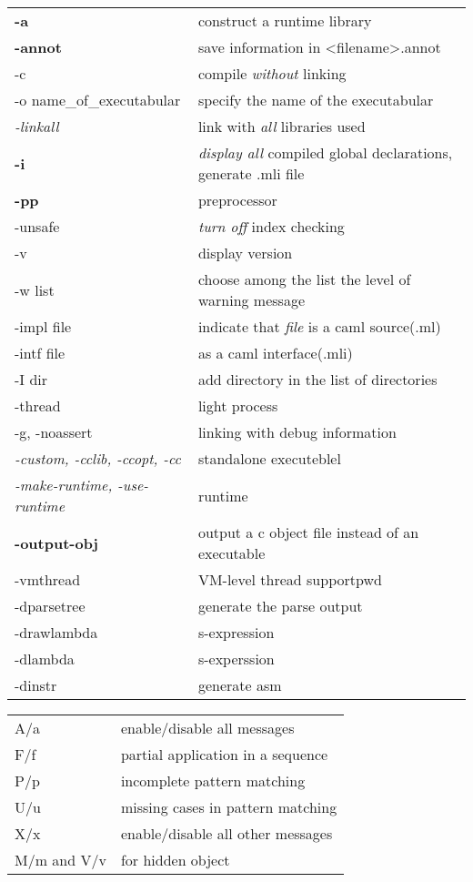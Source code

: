   



  \begin{tabular}{|l|l|}
    \hline
    \textbf{-a} & construct a runtime library \\
    \textbf{-annot} & save information in <filename>.annot \\
    -c & compile \textit{without} linking \\
    -o name\_of\_executabular & specify the name of the executabular \\
    \emph{-linkall} & link with \textit{all} libraries used \\
    \textbf{-i} & \textit{display all } compiled global declarations, generate
    .mli file \\
    \textbf{-pp} & preprocessor \\
    -unsafe & \textit{turn off} index checking \\
    -v & display version \\
    -w list & choose among the list the level of warning message \\
    -impl file & indicate that \textit{file} is a caml source(.ml) \\
    -intf file & as a caml interface(.mli) \\
    -I dir & add directory in the list of directories \\
    \hline
    -thread & light process \\
    -g, -noassert & linking  with debug information\\
    \textit{-custom, -cclib, -ccopt, -cc} & standalone executeblel \\
    \textit{-make-runtime, -use-runtime} & runtime \\
    \textbf{-output-obj} & output a c object file instead of an
    executable \\
    \hline
    -vmthread & VM-level thread supportpwd
\\
    \hline
    -dparsetree & generate the parse output\\
    -drawlambda & s-expression\\
    -dlambda & s-experssion \\
    -dinstr & generate asm \\
    \hline
\end{tabular}


\begin{tabular}{|l|l|}
    \hline
  A/a & enable/disable all messages \\
  F/f & partial application in a sequence \\
  P/p & incomplete pattern matching \\
  U/u & missing cases in pattern matching \\
  X/x & enable/disable all other messages \\
  M/m and V/v & for hidden object \\
  \hline
\end{tabular}

